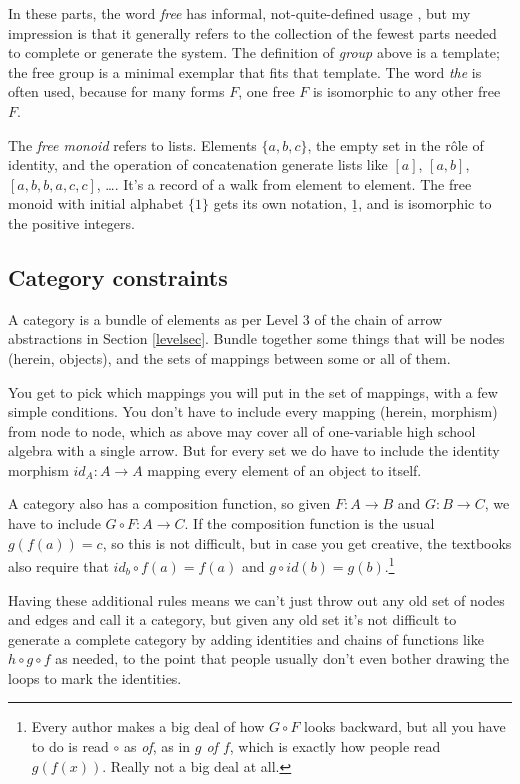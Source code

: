 \documentclass[11pt]{article}
\begin{document}
In these parts, the word {\em free} has informal, not-quite-defined usage
\citep{leinster:basic}, but my impression is that it generally refers to the collection
of the fewest parts needed to complete or generate the system.  The definition of
{\em group} above is a template; the free group is a minimal exemplar that fits that
template. The word {\em the} is often used, because for many forms $F$, one free $F$
is isomorphic to any other free $F$.

The {\em free monoid} refers to lists. Elements $\{a, b, c\}$, the empty set in the r\^ole
of identity,  and the operation
of concatenation generate lists like $[a]$, $[a,b]$, $[a,b,b,a,c,c]$, \dots. It's a
record of a walk from element to element. The free monoid with initial alphabet $\{1\}$
gets its own notation, $\underline 1$, and is isomorphic to the positive integers.

\subsection{Category constraints}
A category is a bundle of elements as per Level 3 of the chain of arrow abstractions
in Section \ref{levelsec}. Bundle together some things that will be nodes (herein,
objects), and the sets of mappings between some or all of them.

You get to pick which mappings you will put in the set of mappings, with a few simple conditions.
You don't have to include every mapping (herein, morphism) from node to node, which as above may cover all of one-variable high school algebra with a single arrow. But for every set we do have to include
the identity morphism $id_A:A\to A$ mapping every element of an object to itself.

A category also has a composition function, so given $F:A\to B$
and $G:B\to C$, we have to include $G\circ F:A\to C$. If the composition function
is the usual $g(f(a)) = c$, so this is not difficult, but in case you get
creative, the textbooks also require that $id_b\circ f(a)=f(a)$ and $g\circ id(b)
= g(b)$.\footnote{Every author makes a big deal of how $G\circ F$ looks backward,
but all you have to do is read $\circ$ as {\em of}, as in {\em $g$ of $f$}, which is
exactly how people read $g(f(x))$. Really not a big deal at all.}

Having these additional rules means we can't just throw out any old set of nodes and edges
and call it a category, but given any old set it's not difficult to generate a complete
category by adding identities and chains of functions like $h\circ g\circ f$ as needed,
to the point that people usually don't even bother drawing the loops to mark the
identities.
\end{document}
